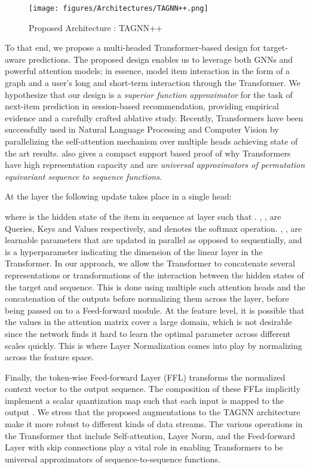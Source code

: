 \documentclass[conference]{IEEEtran}
\begin{document}
\begin{figure}[htb]
    \centering
    \texttt{[image: figures/Architectures/TAGNN++.png]}
    \caption{Proposed Architecture : TAGNN++}
    \label{arch}
\end{figure}





To that end, we propose a multi-headed Transformer-based design for target-aware predictions. The proposed design enables us to leverage both GNNs and powerful attention models; in essence, model item interaction in the form of a graph and a user's long and short-term interaction through the Transformer. We hypothesize that our design is a \textit{superior function approximator} for the task of next-item prediction in session-based recommendation, providing empirical evidence and a carefully crafted ablative study. Recently, Transformers have been successfully used in Natural Language Processing and Computer Vision by parallelizing the self-attention \cite{NIPS2017_3f5ee243} mechanism over multiple heads achieving state of the art results. \cite{yun2019Transformers} also gives a compact support based proof of why Transformers have high representation capacity and are \textit{universal approximators of permutation equivariant sequence to sequence functions}. 

At the  layer the following update takes place in a single head:



where  is the hidden state of the  item in sequence  at layer  such that . , ,  are Queries, Keys and Values respectively, and  denotes the softmax operation. , ,  are learnable parameters that are updated in parallel as opposed to sequentially, and  is a hyperparameter indicating the dimension of the linear layer in the Transformer. In our approach, we allow the Transformer to concatenate several representations or transformations of the interaction between the hidden states of the target and sequence. This is done using multiple such attention heads and the concatenation of the outputs before normalizing them across the layer, before being passed on to a Feed-forward module. At the feature level, it is possible that the values in the attention matrix cover a large domain, which is not desirable since the network finds it hard to learn the optimal parameter across different scales quickly. This is where Layer Normalization comes into play by normalizing across the feature space. 


Finally, the token-wise Feed-forward Layer (FFL) transforms the normalized context vector to the output sequence. The composition of these FFLs implicitly implement a scalar quantization map such that each input is mapped to the output \cite{yun2019Transformers}. We stress that the proposed augmentations to the TAGNN architecture make it more robust to different kinds of data streams. The various operations in the Transformer that include Self-attention, Layer Norm, and the Feed-forward Layer with skip connections play a vital role in enabling Transformers to be universal approximators of sequence-to-sequence functions.
\end{document}

